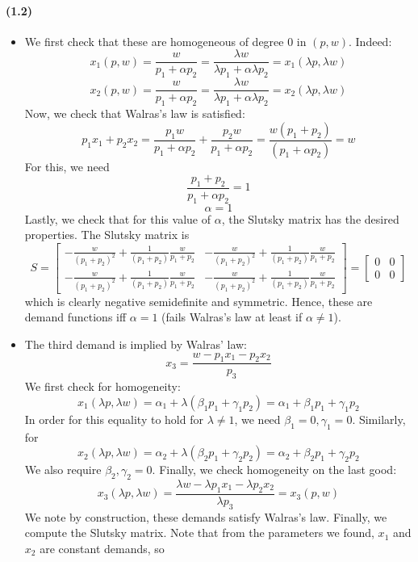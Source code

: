\documentclass[10pt,letter]{article}
\begin{document}
\paragraph{(1.2)}
\begin{itemize}
\item We first check that these are homogeneous of degree 0 in $(p,w)$. Indeed:
\[ x_1(p,w) = \frac{w}{p_1 + \alpha p_2}= \frac{\lambda w}{\lambda p_1 + \alpha \lambda p_2} = x_1(\lambda p, \lambda w) \]
\[ x_2(p,w) = \frac{w}{p_1 + \alpha p_2}= \frac{\lambda w}{\lambda p_1 + \alpha \lambda p_2} = x_2(\lambda p, \lambda w) \]
Now, we check that Walras's law is satisfied:
\[ p_1x_1 + p_2x_2 = \frac{p_1 w}{p_1 + \alpha p_2} + \frac{p_2 w}{p_1 + \alpha p_2} = \frac{w(p_1 + p_2)}{(p_1 + \alpha p_2)}  = w\]
For this, we need
\[  \frac{p_1 + p_2}{p_1 + \alpha p_2} = 1 \]
\[ \alpha = 1 \]
Lastly, we check that for this value of $\alpha$, the Slutsky matrix has the desired properties. The Slutsky matrix is
\[ S =
\begin{bmatrix}
-\frac{w}{(p_1 + p_2)^2} + \frac{1}{(p_1 + p_2)}\frac{w}{p_1 + p_2} & -\frac{w}{(p_1 + p_2)^2} + \frac{1}{(p_1 + p_2)}\frac{w}{p_1 + p_2}  \\
-\frac{w}{(p_1 + p_2)^2} + \frac{1}{(p_1 + p_2)}\frac{w}{p_1 + p_2} & -\frac{w}{(p_1 + p_2)^2} + \frac{1}{(p_1 + p_2)}\frac{w}{p_1 + p_2}
\end{bmatrix}
= \begin{bmatrix}
0 & 0 \\
0 & 0
\end{bmatrix}
 \]
which is clearly negative semidefinite and symmetric. Hence, these are demand functions iff $\alpha = 1$ (fails Walras's law at least if $\alpha \neq 1$).
\item The third demand is implied by Walras' law:
\[ x_3 = \frac{w - p_1x_1 - p_2x_2}{p_3}  \]
We first check for homogeneity:
\[ x_1(\lambda p,\lambda w) = \alpha_1 + \lambda(\beta_1 p_1 + \gamma_1 p_2) = \alpha_1 + \beta_1 p_1 + \gamma_1 p_2  \]
In order for this equality to hold for $\lambda \neq 1$, we need $\beta_1 = 0, \gamma_1 = 0$. Similarly, for
\[ x_2(\lambda p,\lambda w) = \alpha_2 + \lambda(\beta_2p_1 + \gamma_2 p_2) = \alpha_2 + \beta_2 p_1 + \gamma_2 p_2  \]
We also require $\beta_2, \gamma_2 = 0$. Finally, we check homogeneity on the last good:
\[ x_3(\lambda p, \lambda w) = \frac{\lambda w - \lambda p_1 x_1 - \lambda p_2 x_2}{\lambda p_3} = x_3(p, w) \]
We note by construction, these demands satisfy Walras's law. Finally, we compute the Slutsky matrix. Note that from the parameters we found, $x_1$ and $x_2$ are constant demands, so

\end{itemize}
\end{document}
